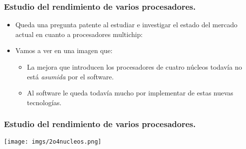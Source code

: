 \frame
{
\frametitle{Estudio del rendimiento de varios procesadores.}
\begin{itemize}
\item Queda una pregunta patente al estudiar e investigar el estado del mercado actual en cuanto a procesadores multichip:

	\begin{center}
	\scriptsize {}
	\end{center}

\item Vamos a ver en una imagen que:
	\begin{itemize}
	\item La mejora que introducen los procesadores de cuatro núcleos todavía no está \textit{asumida} por el software.
	\item Al software le queda todavía mucho por implementar de estas nuevas tecnologías.
	\end{itemize}
\end{itemize}
}

\frame
{
\frametitle{Estudio del rendimiento de varios procesadores.}
\begin{center}
\texttt{[image: imgs/2o4nucleos.png]}
\end{center}
}
